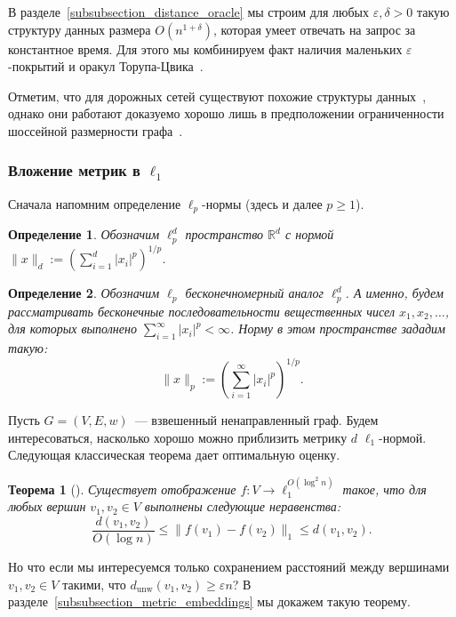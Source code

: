 \documentclass[12pt]{article}
\newcommand{\eps}{\varepsilon}
\newcommand{\dunw}{d_{\mathrm{unw}}}
\newcommand{\abs}[1]{\left|#1\right|}
\newcommand{\Rbb}{\mathbb{R}}
\newtheorem{definition}{Определение}
\newtheorem{theorem}{Теорема}
\begin{document}
    В разделе~\ref{subsubsection_distance_oracle} мы строим для любых $\eps, \delta > 0$
    такую структуру данных размера $O(n^{1 + \delta})$, которая умеет отвечать на запрос за константное время.
    Для этого мы комбинируем факт наличия маленьких $\eps$-покрытий и оракул Торупа-Цвика~\cite{TZ05}.

    Отметим, что для дорожных сетей существуют похожие структуры данных~\cite{BFMSS07}, однако они работают доказуемо хорошо лишь в предположении
    ограниченности шоссейной размерности графа~\cite{AFGW10}.

    \subsubsection{Вложение метрик в $\ell_1$}

    Сначала напомним определение $\ell_p$-нормы (здесь и далее $p \geq 1$).

    \begin{definition}
        Обозначим $\ell_p^d$ пространство $\Rbb^d$ с нормой $\|x\|_d := \left(\sum_{i=1}^d \abs{x_i}^p\right)^{1/p}$.
    \end{definition}
    \begin{definition}
        Обозначим $\ell_p$ бесконечномерный аналог $\ell_p^d$. А именно, будем рассматривать бесконечные последовательности вещественных чисел
        $x_1, x_2, \ldots$, для которых выполнено $\sum_{i=1}^{\infty} \abs{x_i}^p < \infty$.
        Норму в этом пространстве зададим такую:
        $$
            \|x\|_p := \left(\sum_{i=1}^{\infty} \abs{x_i}^p \right)^{1/p}. 
        $$
    \end{definition}

    Пусть $G = (V, E, w)$~--- взвешенный ненаправленный граф.
    Будем интересоваться, насколько хорошо можно приблизить метрику $d$ $\ell_1$-нормой.
    Следующая классическая теорема дает оптимальную оценку.
    \begin{theorem}[\cite{B85}]
        \label{theorem_bourgain}
        Существует отображение $f \colon V \to \ell_1^{O(\log^2 n)}$ такое, что для любых вершин 
        $v_1, v_2 \in V$ выполнены следующие неравенства:
        $$
            \frac{d(v_1, v_2)}{O(\log n)} \leq \|f(v_1) - f(v_2)\|_1 \leq d(v_1, v_2).
        $$
    \end{theorem}

    Но что если мы интересуемся только сохранением расстояний между вершинами $v_1, v_2 \in V$ такими, что
    $\dunw(v_1, v_2) \geq \eps n$? В разделе~\ref{subsubsection_metric_embeddings} мы докажем такую теорему.
\end{document}
